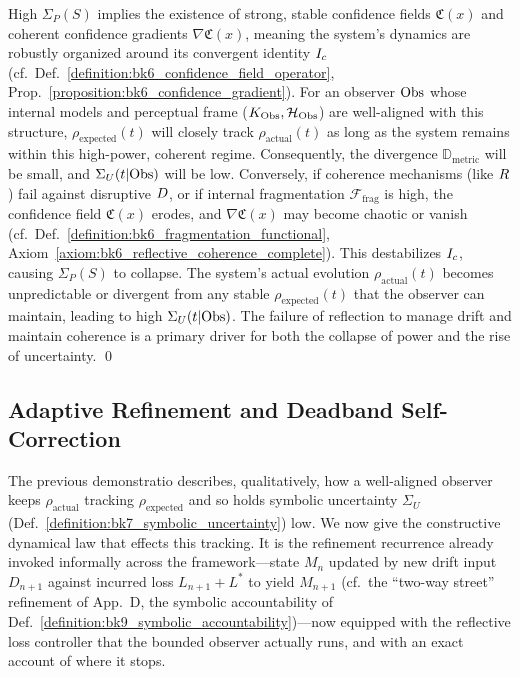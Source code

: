 \begin{demonstratio}
\label{demonstratio:bk7_coherence_fulcrum_power_certainty}
High \(\Sigma_P(S)\) implies the existence of strong, stable confidence fields \(\mathfrak{C}(x)\) and coherent confidence gradients \(\nabla \mathfrak{C}(x)\), meaning the system's dynamics are robustly organized around its convergent identity \(I_c\) (cf.~Def.~\ref{definition:bk6_confidence_field_operator}, Prop.~\ref{proposition:bk6_confidence_gradient}). For an observer \(\mathrm{Obs}\) whose internal models and perceptual frame (\(K_{\mathrm{Obs}}, \mathcal{H}_{\mathrm{Obs}}\)) are well-aligned with this structure, \(\rho_{\text{expected}}(t)\) will closely track \(\rho_{\text{actual}}(t)\) as long as the system remains within this high-power, coherent regime. Consequently, the divergence \(\mathbb{D}_{\text{metric}}\) will be small, and \(\Sigma_U(t|\mathrm{Obs})\) will be low.
Conversely, if coherence mechanisms (like \(R\)) fail against disruptive \(D\), or if internal fragmentation \(\mathcal{F}_{\text{frag}}\) is high, the confidence field \(\mathfrak{C}(x)\) erodes, and \(\nabla \mathfrak{C}(x)\) may become chaotic or vanish (cf.~Def.~\ref{definition:bk6_fragmentation_functional}, Axiom~\ref{axiom:bk6_reflective_coherence_complete}). This destabilizes \(I_c\), causing \(\Sigma_P(S)\) to collapse. The system's actual evolution \(\rho_{\text{actual}}(t)\) becomes unpredictable or divergent from any stable \(\rho_{\text{expected}}(t)\) that the observer can maintain, leading to high \(\Sigma_U(t|\mathrm{Obs})\). The failure of reflection to manage drift and maintain coherence is a primary driver for both the collapse of power and the rise of uncertainty. \qed
\end{demonstratio}

\subsection{Adaptive Refinement and Deadband Self-Correction}
\label{subsec:bk7_adaptive_refinement_deadband}
The previous demonstratio describes, qualitatively, how a well-aligned observer
keeps $\rho_{\text{actual}}$ tracking $\rho_{\text{expected}}$ and so holds
symbolic uncertainty $\Sigma_U$ (Def.~\ref{definition:bk7_symbolic_uncertainty})
low. We now give the constructive dynamical law that effects this tracking. It is
the refinement recurrence already invoked informally across the framework---state
$M_n$ updated by new drift input $D_{n+1}$ against incurred loss
$L_{n+1}+L^{\ast}$ to yield $M_{n+1}$ (cf.~the ``two-way street'' refinement of
App.~D, the symbolic accountability of
Def.~\ref{definition:bk9_symbolic_accountability})---now equipped with the
reflective loss controller that the bounded observer actually runs, and with an
exact account of where it stops.

